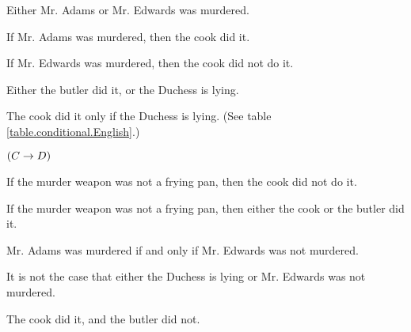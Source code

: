 \problempart 
\begin{earg}
\item Either Mr. Adams or Mr. Edwards was murdered.
\item[] 
\item If Mr. Adams was murdered, then the cook did it.
\item[] 
\item If Mr. Edwards was murdered, then the cook did not do it.
\item[] 
\item Either the butler did it, or the Duchess is lying.
\item[] 
\item The cook did it only if the Duchess is lying. (See table \ref{table.conditional.English}.) 
\item[] $(C \rightarrow D)$
\item If the murder weapon was not a frying pan, then the cook did not do it.
\item[] 
\item If the murder weapon was not a frying pan, then either the cook or the butler did it.
\item[] 
\item Mr. Adams was murdered if and only if Mr. Edwards was not murdered.
\item[] 
\item It is not the case that either the Duchess is lying or Mr. Edwards was not murdered.
\item[] 
\item The cook did it, and the butler did not.
\item[] 
\end{earg}


